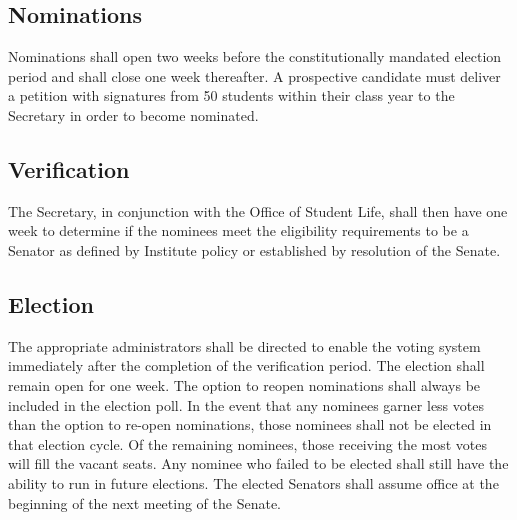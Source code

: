 \documentclass[12pt]{scrreprt}
\begin{document}
\subsection{Nominations}
Nominations shall open two weeks before the constitutionally mandated election 
period and shall close one week thereafter. A prospective candidate must 
deliver a petition with signatures from 50 students within their class year to 
the Secretary in order to become nominated.

\subsection{Verification} \label{sec:election_verification}
The Secretary, in conjunction with the Office of Student Life, shall then have 
one week to determine if the nominees meet the eligibility requirements to be 
a Senator as defined by Institute policy or established by resolution of the 
Senate. 

\subsection{Election}
The appropriate administrators shall be directed to enable the voting system 
immediately after the completion of the verification period. The election 
shall remain open for one week. The option to reopen nominations shall always be included in the election poll. In the event that any nominees garner less votes than the option to re-open nominations, those nominees shall not be elected in that election cycle. Of the remaining nominees, those receiving the most votes will fill the vacant seats. Any nominee who failed to be elected shall still have the ability to run in future elections. The elected Senators shall assume office at the beginning of the next meeting of the Senate.
\end{document}

